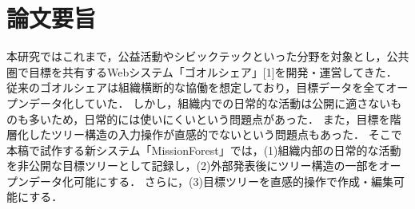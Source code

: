 \chapter*{論文要旨}
\label{chap0}
本研究ではこれまで，公益活動やシビックテックといった分野を対象とし，公共圏で目標を共有するWebシステム「ゴオルシェア」[1]を開発・運営してきた．
従来のゴオルシェアは組織横断的な協働を想定しており，目標データを全てオープンデータ化していた．
しかし，組織内での日常的な活動は公開に適さないものも多いため，日常的には使いにくいという問題点があった．
また，目標を階層化したツリー構造の入力操作が直感的でないという問題点もあった．
そこで本稿で試作する新システム「MissionForest」では，(1)組織内部の日常的な活動を非公開な目標ツリーとして記録し，(2)外部発表後にツリー構造の一部をオープンデータ化可能にする．
さらに，(3)目標ツリーを直感的操作で作成・編集可能にする．
